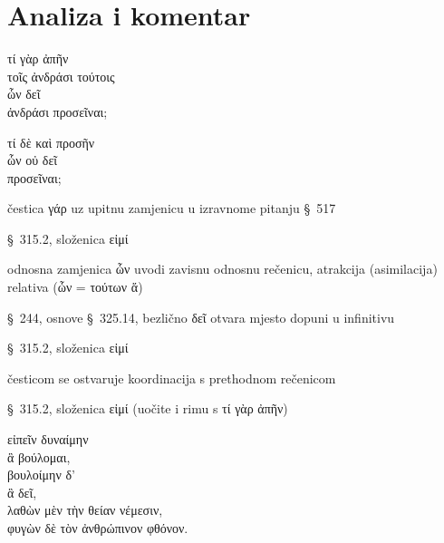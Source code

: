 \section*{Analiza i komentar}


{\large
\begin{greek}
\noindent τί γὰρ ἀπῆν \\
τοῖς ἀνδράσι τούτοις \\
\tabto{2em} ὧν δεῖ \\
\tabto{4em} ἀνδράσι προσεῖναι;

\noindent τί δὲ καὶ προσῆν \\
\tabto{2em} ὧν οὐ δεῖ \\
\tabto{4em} προσεῖναι;\\
\end{greek}
}

\begin{description}[noitemsep]
\item[τί γὰρ] čestica γάρ uz upitnu zamjenicu u izravnome pitanju §~517
\item[ἀπῆν] §~315.2, složenica εἰμί
\item[ὧν δεῖ] odnosna zamjenica ὧν uvodi zavisnu odnosnu rečenicu, atrakcija (asimilacija) relativa \textgreek{(ὧν = τούτων ἅ)}
\item[δεῖ] §~244, osnove §~325.14, bezlično δεῖ otvara mjesto dopuni u infinitivu
\item[προσεῖναι] §~315.2, složenica εἰμί
\item[τί δὲ ] česticom se ostvaruje koordinacija s prethodnom rečenicom
\item[προσῆν] §~315.2, složenica εἰμί (uočite i rimu s τί γὰρ ἀπῆν)

\end{description}



{\large
\begin{greek}
\noindent εἰπεῖν δυναίμην \\
\tabto{2em} ἃ βούλομαι, \\
βουλοίμην δ' \\
\tabto{2em} ἃ δεῖ, \\
λαθὼν μὲν τὴν θείαν νέμεσιν, \\
φυγὼν δὲ τὸν ἀνθρώπινον φθόνον.\\

\end{greek}
}

